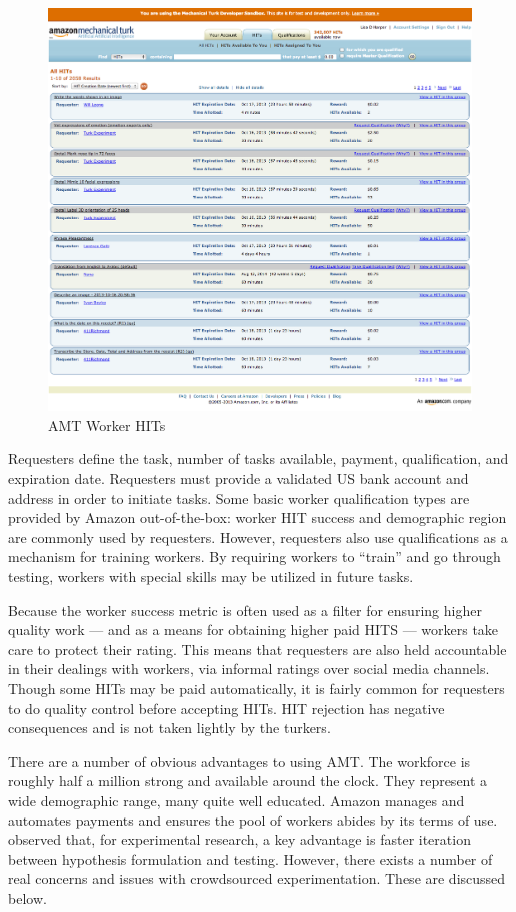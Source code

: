 \begin{figure}
\centerline{
  \includegraphics[scale=.5]{chapter4.tex/worker-hits}
  }
\caption{AMT Worker HITs}
\label{worker}
\end{figure}


Requesters define the task, number of tasks available, payment, qualification, and expiration date. Requesters must provide a validated US bank account and address in order to initiate tasks. Some basic worker qualification types are provided by Amazon out-of-the-box: worker HIT success and demographic region are commonly used by requesters. However, requesters also use qualifications as a mechanism for training workers. By requiring workers to ``train'' and go through testing, workers with special skills may be utilized in future tasks.

Because the worker success metric is often used as a filter for ensuring higher quality work --- and as a means for obtaining higher paid HITS --- workers take care to protect their rating. This means that requesters are also held accountable in their dealings with workers, via informal ratings over social media channels. Though some HITs may be paid automatically, it is fairly common for requesters to do quality control before accepting HITs. HIT rejection has negative consequences and is not taken lightly by the turkers.

There are a number of obvious advantages to using AMT. The workforce is roughly half a million strong and available around the clock. They represent a wide demographic range, many quite well educated. Amazon manages and automates payments and ensures the pool of workers abides by its terms of use.  \cite{Mason:2011cl}  observed that, for experimental research, a key advantage is faster iteration between hypothesis formulation and testing. However, there exists a number of real concerns and issues with crowdsourced experimentation. These are discussed below.

